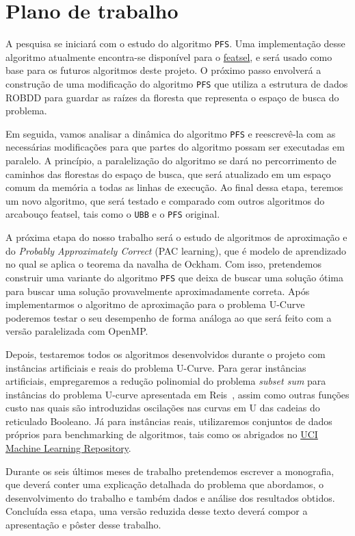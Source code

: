 \documentclass[12pt]{article}
\begin{document}
\section{Plano de trabalho}
A pesquisa se iniciará com o estudo do algoritmo {\tt PFS}. Uma 
implementação desse algoritmo atualmente encontra-se disponível para o  
\href{https://github.com/msreis/featsel}{featsel}, e será 
usado como base para os futuros algoritmos deste projeto. O próximo 
passo envolverá a construção de uma modificação do algoritmo {\tt PFS}
que utiliza a estrutura de dados ROBDD para guardar as raízes da 
floresta que representa o espaço de busca do problema.

Em seguida, vamos analisar a dinâmica do algoritmo {\tt PFS} e
reescrevê-la com as necessárias modificações para que partes do
algoritmo possam ser executadas em paralelo. A princípio, a
paralelização do algoritmo se dará no percorrimento de caminhos das
florestas do espaço de busca, que será atualizado em um espaço comum da
memória a todas as linhas de execução. Ao final dessa etapa, teremos um
novo algoritmo, que será testado e comparado com outros algoritmos do
arcabouço featsel, tais como o {\tt UBB} e o {\tt PFS} original.

A próxima etapa do nosso trabalho será o estudo de algoritmos de 
aproximação e do \textit{Probably Approximately
Correct} (PAC learning), que é modelo de aprendizado no qual se aplica o
teorema da navalha de Ockham. Com isso, pretendemos construir uma 
variante do algoritmo {\tt PFS} que deixa de buscar uma solução ótima 
para buscar uma solução provavelmente aproximadamente correta. Após 
implementarmos o algoritmo de aproximação para o problema U-Curve 
poderemos testar o seu desempenho de forma análoga ao que será feito 
com a versão paralelizada com OpenMP.

Depois, testaremos todos os algoritmos desenvolvidos durante o projeto
com instâncias artificiais e reais do problema U-Curve. Para gerar 
instâncias artificiais, empregaremos a redução polinomial do problema 
{\em subset sum} para instâncias do problema U-curve apresentada em 
Reis~\cite{msreis thesis}, assim como outras funções custo  nas quais
são introduzidas oscilações nas curvas em U das cadeias
do reticulado Booleano. Já para instâncias reais, utilizaremos conjuntos
de dados próprios para benchmarking de algoritmos, tais como os 
abrigados no \href{archive.ics.uci.edu/ml}{UCI Machine Learning 
Repository}.

Durante os seis últimos meses de trabalho pretendemos escrever a 
monografia, que deverá conter uma explicação detalhada do problema 
que abordamos, o desenvolvimento do trabalho e também dados e análise
dos resultados obtidos. Concluída essa etapa, uma versão reduzida desse
texto deverá compor a apresentação e pôster desse trabalho.
\end{document}
